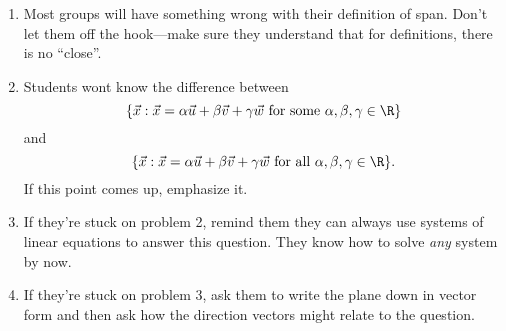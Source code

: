 		\begin{enumerate}
			\item Most groups will have something wrong with their definition of span.
				Don't let them off the hook---make sure they understand that for
				definitions, there is no ``close''.
			\item Students wont know the difference between
				\[
			\{\vec x:\vec x=\alpha\vec u+\beta\vec v+\gamma \vec w\text{ for some }\alpha,\beta,\gamma\in \R\}
				\]
				and
				\[
			\{\vec x:\vec x=\alpha\vec u+\beta\vec v+\gamma \vec w\text{ for all }\alpha,\beta,\gamma\in \R\}.
				\]
				If this point comes up, emphasize it.
			\item If they're stuck on problem 2, remind them they can always use systems of linear equations to answer
				this question. They know how to solve \emph{any} system by now.

			\item If they're stuck on problem 3, ask them to write the plane down in vector form and then
				ask how the direction vectors might relate to the question.
		\end{enumerate}